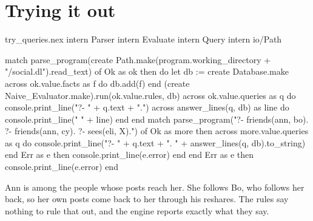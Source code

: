 \section{Trying it out}

\begin{tryit}{try_queries.nex}
intern Parser
intern Evaluate
intern Query
intern io/Path

match parse_program(create Path.make(program.working_directory + "/social.dl").read_text) of
  Ok as ok then
    do
      let db := create Database.make
      across ok.value.facts as f do
        db.add(f)
      end
      (create Naive_Evaluator.make).run(ok.value.rules, db)
      across ok.value.queries as q do
        console.print_line("?- " + q.text + ".")
        across answer_lines(q, db) as line do
          console.print_line("   " + line)
        end
      end
      match parse_program("?- friends(ann, bo). ?- friends(ann, cy). ?- sees(eli, X).") of
        Ok as more then
          across more.value.queries as q do
            console.print_line("?- " + q.text + ".   " + answer_lines(q, db).to_string)
          end
        Err as e then console.print_line(e.error)
      end
    end
  Err as e then console.print_line(e.error)
end
\end{tryit}

Ann is among the people whose posts reach her. She follows Bo, who follows
her back, so her own posts come back to her through his reshares. The rules
say nothing to rule that out, and the engine reports exactly what they say.
